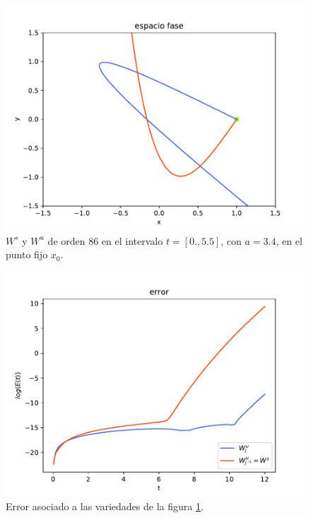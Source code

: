 \begin{figure}[H]
\centering
\includegraphics[scale=0.7]{jung34}
\caption{$W^{s}$ y $W^{u}$ de orden 86 en el intervalo $t=[0.,5.5]$, con $a=3.4$, en el punto fijo $x_{0}$.}
\label{jung1}
\end{figure}

\begin{figure}[H]
\centering
\includegraphics[scale=0.7]{error_jung34}
\caption{Error asociado a las variedades de la figura \ref{jung1}.}
\label{errorjung1}
\end{figure}


